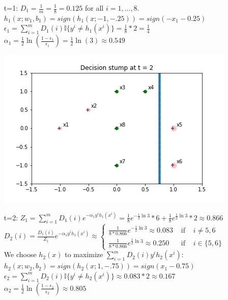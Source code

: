 \documentclass[twoside,10pt]{article}
\begin{document}
\begin{enumerate}
\begin{enumerate}
\begin{tcolorbox}
\begin{itemize}
\item[t=1:] 
$D_1 = \frac 1 m = \frac 1 8 = 0.125 $ for all $i = 1, ..., 8.$ \\

$h_1(x; w_1, b_1) = sign(h_1(x; -1, -.25)) = sign(- x_1 - 0.25) $\\

$\epsilon_1 = \sum_{i=1}^m D_1(i) \mathbb{I}\{y^i \neq h_1(x^i)\} = \frac 1 8 * 2 = \frac 1 4 $\\

$\alpha_1 = \frac 1 2 \ln(\frac{1-\epsilon_1}{\epsilon_1}) = \frac 1 2 \ln(3)  \approx 0.549$

\begin{center}
\includegraphics[width =0.5 \textwidth]{images/time2.jpg} 
\end{center}
\item[t=2:]
$Z_1 = \sum_{i=1}^m D_1(i)e^{-\alpha_1 y^i h_1(x^i)} = \frac{1}{8} e^{-\frac 1 2 \ln 3} * 6 + \frac{1}{8} e^{\frac 1 2 \ln 3} * 2 \approx 0.866 $ \\

$D_2(i) = \frac{D_1(i)}{Z_1}e^{-\alpha_1 y^i h_1(x^i)} \approx \left\{ \begin{array}{lcr} \frac 1 {8 * 0.866} e^{-\frac 1 2 \ln 3}  \approx 0.083 &\mbox{ if }&  i \neq 5,6  \\ \frac 1 {8 * 0.866} e^{\frac 1 2 \ln 3} \approx 0.250 &\mbox{ if }& i \in \{5,6\}\end{array}\right.$\\

We choose $h_2(x)$ to maximize $\sum_{i=1}^m D_2(i)y^i h_2(x^i)$: \\ 
$h_2(x; w_2, b_2) = sign(h_2(x; 1, -.75)) = sign( x_1 - 0.75) $\\

$\epsilon_2 = \sum_{i=1}^m D_2(i) \mathbb{I}\{y^i \neq h_2(x^i)\} \approx 0.083 * 2 \approx 0.167 $\\

$\alpha_2 = \frac 1 2 \ln(\frac{1-\epsilon_2}{\epsilon_2}) \approx 0.805$



\end{itemize}
\end{tcolorbox}
\end{enumerate}
\end{enumerate}
\end{document}
